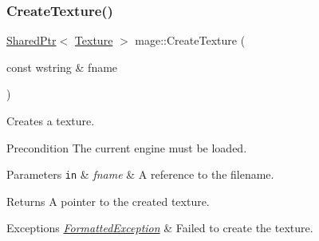 \hypertarget{namespacemage_ac27913e621bde0fd01312183aafaaca0}{}\label{namespacemage_ac27913e621bde0fd01312183aafaaca0} 
\subsubsection{\texorpdfstring{Create\+Texture()}{CreateTexture()}}
{\footnotesize\ttfamily \hyperlink{namespacemage_a1e01ae66713838a7a67d30e44c67703e}{Shared\+Ptr}$<$ \hyperlink{classmage_1_1_texture}{Texture} $>$ mage\+::\+Create\+Texture (\begin{DoxyParamCaption}\item[{const wstring \&}]{fname }\end{DoxyParamCaption})}

Creates a texture.

\begin{DoxyPrecond}{Precondition}
The current engine must be loaded. 
\end{DoxyPrecond}

\begin{DoxyParams}[1]{Parameters}
\mbox{\tt in}  & {\em fname} & A reference to the filename. \\
\hline
\end{DoxyParams}
\begin{DoxyReturn}{Returns}
A pointer to the created texture. 
\end{DoxyReturn}

\begin{DoxyExceptions}{Exceptions}
{\em \hyperlink{structmage_1_1_formatted_exception}{Formatted\+Exception}} & Failed to create the texture. \\
\hline
\end{DoxyExceptions}
\hypertarget{namespacemage_a53fb464961d52002316f17c59ce58078}{}\label{namespacemage_a53fb464961d52002316f17c59ce58078} 
